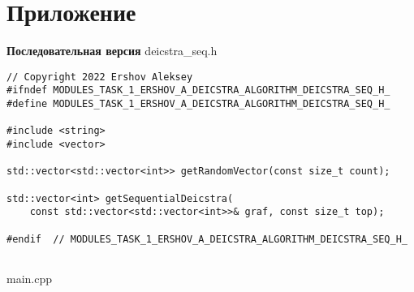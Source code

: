\documentclass{report}
\begin{document}
\section*{Приложение}
\textbf{Последовательная версия}
\newline
\newline deicstra\_seq.h
\begin{lstlisting}
// Copyright 2022 Ershov Aleksey
#ifndef MODULES_TASK_1_ERSHOV_A_DEICSTRA_ALGORITHM_DEICSTRA_SEQ_H_
#define MODULES_TASK_1_ERSHOV_A_DEICSTRA_ALGORITHM_DEICSTRA_SEQ_H_

#include <string>
#include <vector>

std::vector<std::vector<int>> getRandomVector(const size_t count);

std::vector<int> getSequentialDeicstra(
    const std::vector<std::vector<int>>& graf, const size_t top);

#endif  // MODULES_TASK_1_ERSHOV_A_DEICSTRA_ALGORITHM_DEICSTRA_SEQ_H_


\end{lstlisting}
main.cpp
\end{document}
